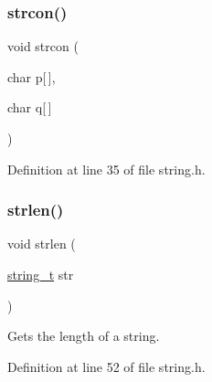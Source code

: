 \subsubsection{\texorpdfstring{strcon()}{strcon()}}
{\footnotesize\ttfamily void strcon (\begin{DoxyParamCaption}\item[{char}]{p\mbox{[}$\,$\mbox{]},  }\item[{char}]{q\mbox{[}$\,$\mbox{]} }\end{DoxyParamCaption})}



Definition at line 35 of file string.\+h.

\mbox{\label{a00029_aaab1d72644d487f9c176d357a9e85bb1_aaab1d72644d487f9c176d357a9e85bb1}} 
\subsubsection{\texorpdfstring{strlen()}{strlen()}}
{\footnotesize\ttfamily void strlen (\begin{DoxyParamCaption}\item[{\hyperlink{a00029_ada436671bc57dfd805a9f3974c81e618_ada436671bc57dfd805a9f3974c81e618}{string\+\_\+t}}]{str }\end{DoxyParamCaption})}



Gets the length of a string. 



Definition at line 52 of file string.\+h.

